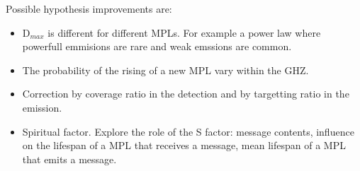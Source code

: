 \documentclass[crop]{CSLB}
\begin{document}
Possible hypothesis improvements are:

\begin{itemize}
   \item D$_{max}$ is different for different MPLs.  For example a power
      law where powerfull emmisions are rare and weak emssions are
      common.
   \item The probability of the rising of a new MPL vary within the GHZ.
   \item Correction by coverage ratio in the detection and by
      targetting ratio in the emission.
   \item Spiritual factor.  Explore the role of the S factor: message
      contents, influence on the lifespan of a MPL that receives a
      message, mean lifespan of a MPL that emits a message.
\end{itemize} 

 




\end{document}
